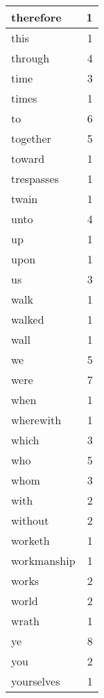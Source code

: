 \begin{center}
\begin{longtable}{l|r}
therefore & 1\\ \hline 
this & 1\\ \hline 
through & 4\\ \hline 
time & 3\\ \hline 
times & 1\\ \hline 
to & 6\\ \hline 
together & 5\\ \hline 
toward & 1\\ \hline 
trespasses & 1\\ \hline 
twain & 1\\ \hline 
unto & 4\\ \hline 
up & 1\\ \hline 
upon & 1\\ \hline 
us & 3\\ \hline 
walk & 1\\ \hline 
walked & 1\\ \hline 
wall & 1\\ \hline 
we & 5\\ \hline 
were & 7\\ \hline 
when & 1\\ \hline 
wherewith & 1\\ \hline 
which & 3\\ \hline 
who & 5\\ \hline 
whom & 3\\ \hline 
with & 2\\ \hline 
without & 2\\ \hline 
worketh & 1\\ \hline 
workmanship & 1\\ \hline 
works & 2\\ \hline 
world & 2\\ \hline 
wrath & 1\\ \hline 
ye & 8\\ \hline 
you & 2\\ \hline 
yourselves & 1\\ \hline 
\end{longtable}  
\end{center}  


  
\normalsize  

  
  
